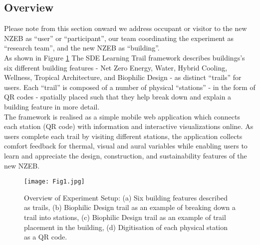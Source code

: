 

\subsection{Overview}

Please note from this section onward we address occupant or visitor to the new NZEB as ``user'' or ``participant'', our team coordinating the experiment as ``research team'', and the new NZEB as ``building''.\\ 

As shown in Figure \ref{fig:framework} The SDE Learning Trail framework describes buildings's six different building features - Net Zero Energy, Water, Hybrid Cooling, Wellness, Tropical Architecture, and Biophilic Design - as distinct ``trails'' for users. Each ``trail'' is composed of a number of physical ``stations'' - in the form of QR codes - spatially placed such that they help break down and explain a building feature in more detail.\\

The framework is realised as a simple mobile web application which connects each station (QR code) with information and interactive visualizations online. As users complete each trail by visiting different stations, the application collects comfort feedback for thermal, visual and aural variables while enabling users to learn and appreciate the design, construction, and sustainability features of the new NZEB.\\

\begin{figure}
\begin{center}
\texttt{[image: Fig1.jpg]}
\caption{Overview of Experiment Setup: (a) Six building features described as trails, (b) Biophilic Design trail as an example of breaking down a trail into stations, (c) Biophilic Design trail as an example of trail placement in the building, (d) Digitisation of each physical station as a QR code.}
\label{fig:framework}
\end{center}
\end{figure}  



